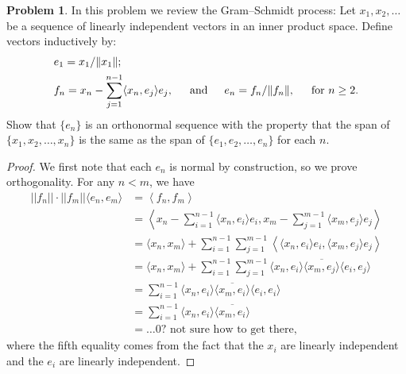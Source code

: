 \documentclass[12pt]{article}
\theoremstyle{definition}
\newtheorem{ex}{Problem}
\begin{document}
\begin{ex}
	In this problem we review the Gram--Schmidt process: Let $x_1, x_2, \dots$ be a sequence of linearly independent vectors in an inner product space.
	Define vectors inductively by: \begin{align*}
		 & e_1 = x_1 / \|x_1\|;                                                                                                                                          \\
		 & f_n = x_n - \sum_{j=1}^{n-1} \langle x_n, e_j \rangle e_j, \hspace{1.5em} \text{and} \hspace{1.5em} e_n = f_n / \|f_n\|, \hspace{1.5em} \text{for } n \geq 2.
	\end{align*}
	Show that $\lbrace e_n \rbrace$ is an orthonormal sequence with the property that the span of $\lbrace x_1, x_2, \dots, x_n \rbrace$ is the same as the span of $\lbrace e_1, e_2, \dots, e_n \rbrace$ for each $n$.
\end{ex}
\begin{proof}
	We first note that each $e_n$ is normal by construction, so we prove orthogonality.
	For any $n < m$, we have \begin{align*}
		||f_n||\cdot||f_m||\langle e_n, e_m \rangle & = \left\langle f_n, f_m \right\rangle                                                                                                             \\
		                                            & = \left\langle x_n - \sum_{i=1}^{n-1}\langle x_n, e_i\rangle e_i, x_m - \sum_{j=1}^{m-1}\langle x_m, e_j\rangle e_j \right\rangle                 \\
		                                            & = \langle x_n, x_m \rangle + \sum_{i=1}^{n-1}\sum_{j=1}^{m-1} \left\langle\langle x_n, e_i \rangle e_i, \langle x_m, e_j \rangle e_j\right\rangle \\
		                                            & = \langle x_n, x_m \rangle + \sum_{i=1}^{n-1}\sum_{j=1}^{m-1}\langle x_n, e_i \rangle \overline{\langle x_m, e_j \rangle} \langle e_i, e_j\rangle \\
		                                            & = \sum_{i=1}^{n-1}\langle x_n, e_i \rangle \overline{\langle x_m, e_i \rangle} \langle e_i, e_i\rangle                                            \\
		                                            & = \sum_{i=1}^{n-1}\langle x_n, e_i \rangle \overline{\langle x_m, e_i \rangle}                                                                    \\
		                                            & = \dots0\text{? not sure how to get there},
	\end{align*}
	where the fifth equality comes from the fact that the $x_i$ are linearly independent and the $e_i$ are linearly independent.
\end{proof}
\end{document}
